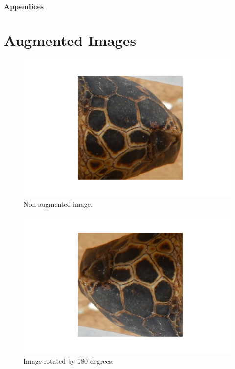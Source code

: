 \appendix
\Huge{\textbf{Appendices}}

\section{Augmented Images}\label{apx:augmentedImages}

\begin{figure}[h]
    \centering
    \includegraphics{images/turtles/augmented/base.png}
    \caption{Non-augmented image.}
    \label{fig:turtleBase}
\end{figure}

\begin{figure}[h!]
    \centering
    \includegraphics{images/turtles/augmented/rotated.png}
    \caption{Image rotated by 180 degrees.}
    \label{fig:turtleRotated}
\end{figure}

